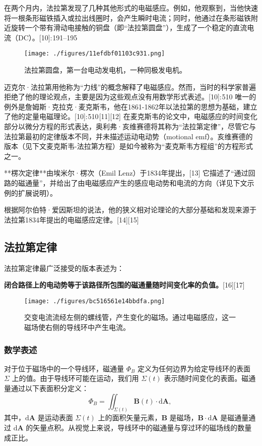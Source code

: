 在两个月内，法拉第发现了几种其他形式的电磁感应。例如，他观察到，当他快速将一根条形磁铁插入或拉出线圈时，会产生瞬时电流；同时，他通过在条形磁铁附近旋转一个带有滑动电接触的铜盘（即“法拉第圆盘”），生成了一个稳定的直流电流（DC）。[10]: 191–195 
\begin{figure}[ht]
\centering
\texttt{[image: ./figures/11efdbf01103c931.png]}
\caption{法拉第圆盘，第一台电动发电机，一种同极发电机。} \label{fig_FLDL_3}
\end{figure}
迈克尔·法拉第用他称为“力线”的概念解释了电磁感应。然而，当时的科学家普遍拒绝了他的理论观点，主要是因为这些观点没有用数学形式表述。[10]: 510 唯一的例外是詹姆斯·克拉克·麦克斯韦，他在1861-1862年以法拉第的思想为基础，建立了他的定量电磁理论。[10]: 510 [11][12] 在麦克斯韦的论文中，电磁感应的时间变化部分以微分方程的形式表达，奥利弗·亥维赛德将其称为“法拉第定律”，尽管它与法拉第最初的定律版本不同，并未描述运动电动势（motional emf）。亥维赛德的版本（见下文麦克斯韦-法拉第方程）是如今被称为“麦克斯韦方程组”的方程形式之一。

**楞次定律**由埃米尔·楞次（Emil Lenz）于1834年提出，[13] 它描述了“通过回路的磁通量”，并给出了由电磁感应产生的感应电动势和电流的方向（详见下文示例的扩展说明）。

根据阿尔伯特·爱因斯坦的说法，他的狭义相对论理论的大部分基础和发现来源于法拉第1834年提出的电磁感应定律。[14][15]
\subsection{法拉第定律}
法拉第定律最广泛接受的版本表述为：  

\textbf{闭合路径上的电动势等于该路径所包围的磁通量随时间变化率的负值。}[16][17]
\begin{figure}[ht]
\centering
\texttt{[image: ./figures/bc516561e14bbdfa.png]}
\caption{交变电流流经左侧的螺线管，产生变化的磁场。通过电磁感应，这一磁场使右侧的导线环中产生电流。} \label{fig_FLDL_4}
\end{figure}
\subsubsection{数学表述}
对于位于磁场中的一个导线环，磁通量 \( \Phi_B \) 定义为任何边界为给定导线环的表面 \( \Sigma \) 上的值。由于导线环可能在运动，我们用 \( \Sigma(t) \) 表示随时间变化的表面。磁通量通过以下表面积分定义：  
\[
\Phi_B = \iint_{\Sigma(t)} \mathbf{B}(t) \cdot \mathrm{d}\mathbf{A},~
\]  
其中，\( \mathrm{d}\mathbf{A} \) 是运动表面 \( \Sigma(t) \) 上的面积矢量元素，\( \mathbf{B} \) 是磁场，\( \mathbf{B} \cdot \mathrm{d}\mathbf{A} \) 是磁通量通过 \( \mathrm{d}\mathbf{A} \) 的矢量点积。从视觉上来说，导线环中的磁通量与穿过环的磁场线的数量成正比。

